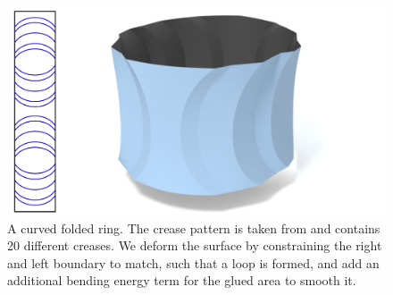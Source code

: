 \begin{figure} [t]
	\centering
	\includegraphics[width=0.65\linewidth]{figures/ring}
	\caption{A curved folded ring. The crease pattern is taken from \cite{mitani2019curved} and contains 20 different creases. We deform the surface by constraining the right and left boundary to match, such that a loop is formed, and add an additional bending energy term for the glued area to smooth it.}
	\label{fig:ring}
\end{figure}